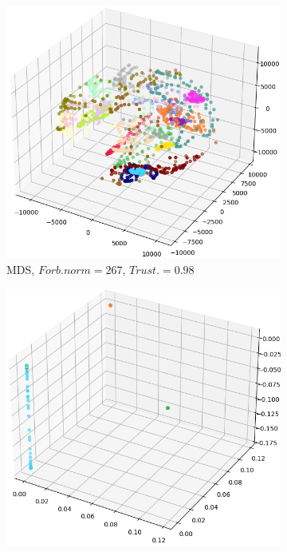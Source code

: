 \begin{figure}[!]
     \centering
     \begin{subfigure}[t]{0.55\columnwidth}
    	\centering
    	\includegraphics[width=\columnwidth]{images/plot_mds_coil20.png}
    	\caption{MDS, $Forb.norm=267$, $Trust.=0.98$}
        \label{fig:plot_mds_coil20}
    \end{subfigure}
     \hfill
     \begin{subfigure}[t]{0.55\columnwidth}
    	\centering
    	\includegraphics[width=\columnwidth]{images/plot_lle_coil20_3.png}

\end{subfigure}
\end{figure}
